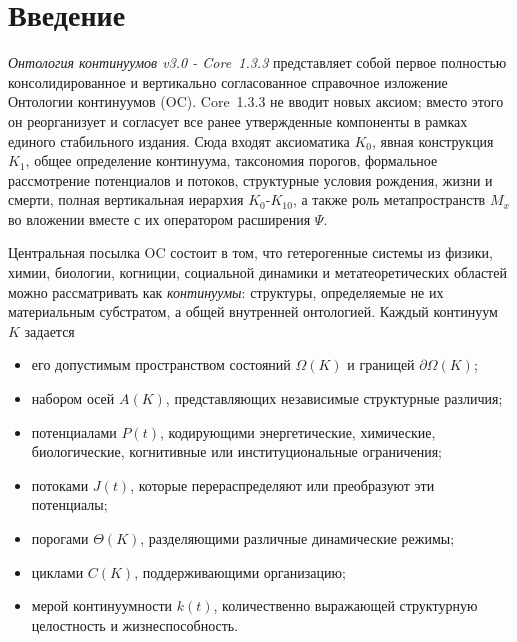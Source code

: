 \section{Введение}
\label{sec:intro}

\emph{Онтология континуумов v3.0 - Core~1.3.3} представляет собой первое полностью консолидированное и вертикально согласованное справочное изложение Онтологии континуумов (OC). Core~1.3.3 не вводит новых аксиом; вместо этого он реорганизует и согласует все ранее утвержденные компоненты в рамках единого стабильного издания. Сюда входят аксиоматика \(K_0\), явная конструкция \(K_1\), общее определение континуума, таксономия порогов, формальное рассмотрение потенциалов и потоков, структурные условия рождения, жизни и смерти, полная вертикальная иерархия \(K_0\)-\(K_{10}\), а также роль метапространств \(M_x\) во вложении вместе с их оператором расширения \(\Psi\).

Центральная посылка OC состоит в том, что гетерогенные системы из физики, химии, биологии, когниции, социальной динамики и метатеоретических областей можно рассматривать как \emph{континуумы}: структуры, определяемые не их материальным субстратом, а общей внутренней онтологией. Каждый континуум \(K\) задается

\begin{itemize}
    \item его допустимым пространством состояний \(\Omega(K)\) и границей \(\partial\Omega(K)\);
    \item набором осей \(A(K)\), представляющих независимые структурные различия;
    \item потенциалами \(P(t)\), кодирующими энергетические, химические, биологические, когнитивные или институциональные ограничения;
    \item потоками \(J(t)\), которые перераспределяют или преобразуют эти потенциалы;
    \item порогами \(\Theta(K)\), разделяющими различные динамические режимы;
    \item циклами \(C(K)\), поддерживающими организацию;
    \item мерой континуумности \(k(t)\), количественно выражающей структурную целостность и жизнеспособность.
\end{itemize}

